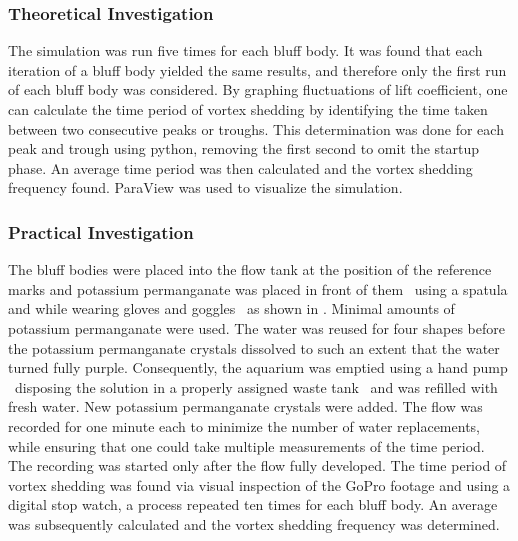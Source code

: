 \subsubsection{Theoretical Investigation}
The simulation was run five times for each bluff body. It was found that each iteration of a bluff body yielded the same results, and therefore only the first run of each bluff body was considered. By graphing fluctuations of lift coefficient, one can calculate the time period of vortex shedding by identifying the time taken between two consecutive peaks or troughs. This determination was done for each peak and trough using python, removing the first second to omit the startup phase. An average time period was then calculated and the vortex shedding frequency found. ParaView was used to visualize the simulation.

\subsubsection{Practical Investigation}
The bluff bodies were placed into the flow tank at the position of the reference marks and potassium permanganate was placed in front of them \textemdash\ using a spatula and while wearing gloves and goggles \textemdash\ as shown in . Minimal amounts of potassium permanganate were used. The water was reused for four shapes before the potassium permanganate crystals dissolved to such an extent that the water turned fully purple. Consequently, the aquarium was emptied using a hand pump \textemdash\ disposing the solution in a properly assigned waste tank \textemdash\ and was refilled with fresh water. New potassium permanganate crystals were added. The flow was recorded for one minute each to minimize the number of water replacements, while ensuring that one could take multiple measurements of the time period. The recording was started only after the flow fully developed. The time period of vortex shedding was found via visual inspection of the GoPro footage and using a digital stop watch, a process repeated ten times for each bluff body. An average was subsequently calculated and the vortex shedding frequency was determined.

